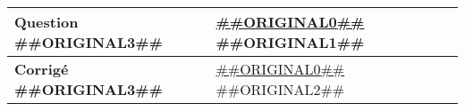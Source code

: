 \documentclass[a4paper,11pt]{article}
\begin{document}
\begin{longtable}{|p{3cm}|p{15cm}|}



\hline 
\textbf{Question ##{{ORIGINAL3}}##} & \underline{##{{ORIGINAL0}}##} \newline ##{{ORIGINAL1}}## \\




\hline 
\textbf{Corrigé ##{{ORIGINAL3}}##} & \underline{##{{ORIGINAL0}}##} \newline ##{{ORIGINAL2}}##  \\




\hline 
\end{longtable} 
\end{document}
